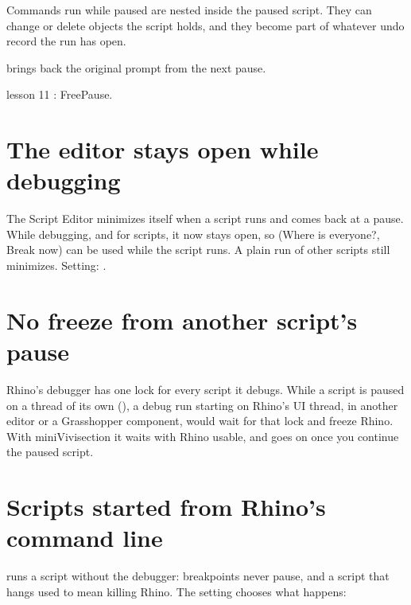 \begin{caution}
Commands run while paused are nested inside the paused script. They can change or delete objects the
script holds, and they become part of whatever undo record the run has open.
\end{caution}

 brings back the original prompt from the next pause.

\begin{lesson}{lesson 11}
: FreePause.
\end{lesson}

\section{The editor stays open while debugging}\label{sec:keepeditor}

The Script Editor minimizes itself when a script runs and comes back at a pause. While debugging, and for
 scripts, it now stays open, so  (Where is everyone?, Break now) can be used
while the script runs. A plain run of other scripts still minimizes. Setting:
.

\section{No freeze from another script's pause}\label{sec:nofreeze}

Rhino's debugger has one lock for every script it debugs. While a script is paused on a thread of its own
(), a debug run starting on Rhino's UI thread, in another editor or a Grasshopper component, would wait
for that lock and freeze Rhino. With miniVivisection it waits with Rhino usable, and goes on once you continue the paused
script.

\section{Scripts started from Rhino's command line}\label{sec:runpythonscript}

 runs a script without the debugger: breakpoints never pause, and a script that hangs
used to mean killing Rhino. The setting  chooses what happens:


